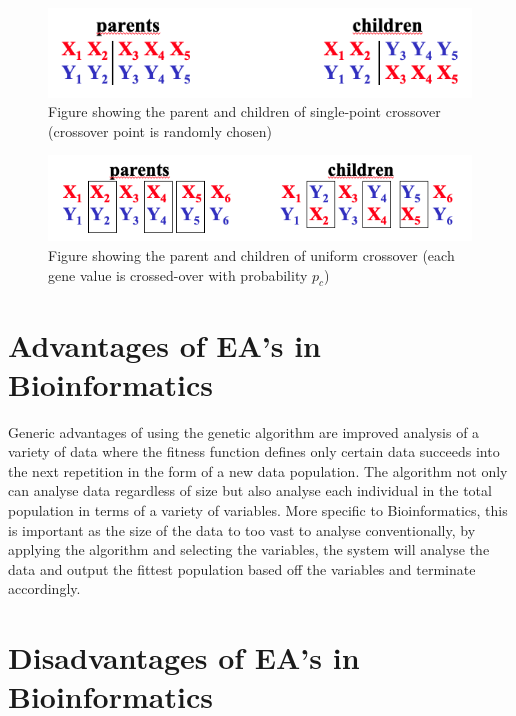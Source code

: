 \documentclass[12pt]{article}
\begin{document}
\begin{figure}[H]
    \centering
    \includegraphics[scale=0.65]{Media/Single.png}
    \caption{Figure showing the parent and children of single-point crossover (crossover point is randomly chosen)}
    \label{fig:single}
\end{figure}

\begin{figure}[H]
    \centering
    \includegraphics[scale=0.6]{Media/Uniform.png}
    \caption{Figure showing the parent and children of uniform crossover (each gene value is crossed-over with probability $p_c$)}
    \label{fig:uniform}
\end{figure}
\section{Advantages of EA's in Bioinformatics}
\label{Advantages of EA in Bioinformatics Section}

Generic advantages of using the genetic algorithm are improved analysis of a variety of data where the fitness function defines only certain data succeeds into the next repetition in the form of a new data population. The algorithm not only can analyse data regardless of size but also analyse each individual in the total population in terms of a variety of variables. More specific to Bioinformatics, this is important as the size of the data to too vast to analyse conventionally, by applying the algorithm and selecting the variables, the system will analyse the data and output the fittest population based off the variables and terminate accordingly.
\section{Disadvantages of EA's in Bioinformatics}
\label{Disadvantages of EA in Bioinformatics Section}
\end{document}
